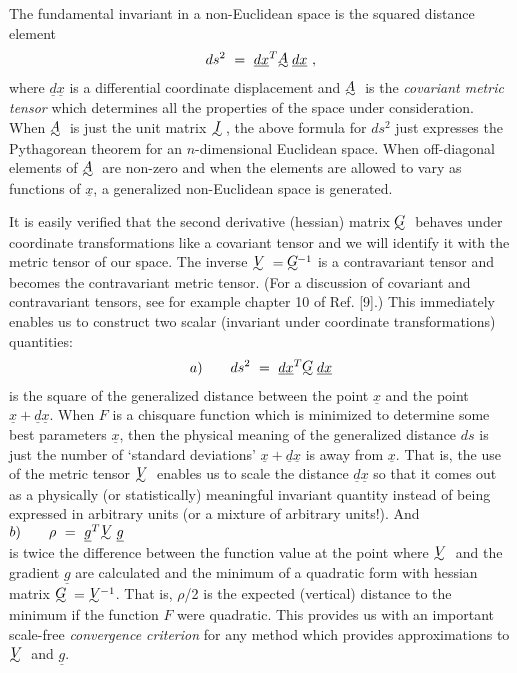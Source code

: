      The fundamental invariant in a non-Euclidean space is the squared
distance element
 $$ds^{2}~=~{\underline{d}}{\underline{x}}^T\UTA{\underline{d}}{\underline{x}}~,$$
 where ${\underline{d}}{\underline{x}}$ is a differential coordinate displacement and $\UTA$ is
the {\em covariant
metric tensor} which determines all the properties of the space under
consideration. When $\UTA$ is just the unit matrix $\UTI$, the above formula for
$ds^2$ just expresses the Pythagorean theorem for an $n$-dimensional
Euclidean
space. When off-diagonal elements of $\UTA$ are non-zero and when the
elements are allowed to vary as functions of ${\underline{x}}$, a generalized
non-Euclidean space is generated.
 
     It is easily verified that the second derivative (hessian) matrix $\UTG$
behaves under coordinate transformations like a covariant tensor and
we will identify it with the metric tensor of our space.  The inverse
$\UTV = \UTG\!\!^{-1}$ is a contravariant tensor and becomes the contravariant metric
tensor.  (For a discussion of covariant and contravariant tensors, see
for example chapter 10 of Ref. [9].)  This immediately enables us to
construct two scalar (invariant under coordinate transformations)
quantities:
$$a)\qquad ds^2~=~ {\underline{d}}{\underline{x}}^T\UTG{\underline{d}}{\underline{x}}$$
is the square of the generalized distance between the point ${\underline{x}}$ and the
point ${\underline{x}} + {\underline{d}}{\underline{x}}$.  When $F$ is a chisquare
 function which is minimized to
determine some best parameters ${\underline{x}}$, then the physical meaning of the
generalized distance $ds$ is just the number of `standard deviations'
 ${\underline{x}} + {\underline{d}}{\underline{x}}$ is away from ${\underline{x}}$.  
That is, the use of the metric tensor $\UTV$
enables
us to scale the distance ${\underline{d}}{\underline{x}}$ so that it comes out as a physically (or
statistically) meaningful invariant quantity instead of being expressed
in arbitrary units (or a mixture of arbitrary units!).
\vskip2mm \noindent
And{\phantom{xxxxxxxxxxxxxxxxxxx}} $b)\qquad \rho~=~{\underline{g}}^T\UTV{\underline{g}}$\\
\vskip2mm
\noindent
 is twice the difference between the function value at the point where $\UTV$
and the gradient ${\underline{g}}$ are calculated and the minimum of a quadratic form
with hessian matrix  $\UTG = \UTV\!\!^{-1}$.  That is, $\rho$/2 is the expected (vertical)
distance to the minimum if the function $F$ were quadratic. This provides
us with an important scale-free {\em convergence criterion} for any method
which provides approximations to $\UTV$ and ${\underline{g}}$.
 
